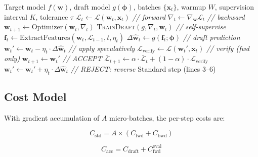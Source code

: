 \documentclass[conference]{IEEEtran}
\begin{document}
\begin{algorithm}[t]
\caption{LST Training Loop}
\label{alg:lst}
\begin{algorithmic}[1]
\REQUIRE Target model $f(\mathbf{w})$, draft model $g(\boldsymbol{\phi})$, batches $\{\mathbf{x}_t\}$, warmup $W$, supervision interval $K$, tolerance $\tau$
        \STATE $\mathcal{L}_t \gets \mathcal{L}(\mathbf{w}_t, \mathbf{x}_t)$ \hfill \textit{// forward}
        \STATE $\nabla_t \gets \nabla_{\mathbf{w}} \mathcal{L}_t$ \hfill \textit{// backward}
        \STATE $\mathbf{w}_{t+1} \gets \mathrm{Optimizer}(\mathbf{w}_t, \nabla_t)$
        \STATE \textsc{TrainDraft}$(g, \nabla_t, \mathbf{w}_t)$ \hfill \textit{// self-supervise}
    \ELSE
        \STATE $\mathbf{f}_t \gets \mathrm{ExtractFeatures}(\mathbf{w}_t, \mathcal{L}_{t-1}, t, \eta_t)$
        \STATE $\Delta\hat{\mathbf{w}}_t \gets g(\mathbf{f}_t; \boldsymbol{\phi})$ \hfill \textit{// draft prediction}
        \STATE $\mathbf{w}_t' \gets \mathbf{w}_t - \eta_t \cdot \Delta\hat{\mathbf{w}}_t$ \hfill \textit{// apply speculatively}
        \STATE $\mathcal{L}_{\mathrm{verify}} \gets \mathcal{L}(\mathbf{w}_t', \mathbf{x}_t)$ \hfill \textit{// verify (fwd only)}
            \STATE $\mathbf{w}_{t+1} \gets \mathbf{w}_t'$ \hfill \textit{// ACCEPT}
            \STATE $\bar{\mathcal{L}}_{t+1} \gets \alpha \cdot \bar{\mathcal{L}}_t + (1 - \alpha) \cdot \mathcal{L}_{\mathrm{verify}}$
        \ELSE
            \STATE $\mathbf{w}_t' \gets \mathbf{w}_t' + \eta_t \cdot \Delta\hat{\mathbf{w}}_t$ \hfill \textit{// REJECT: reverse}
            \STATE Standard step (lines 3--6)
        \ENDIF
    \ENDIF
\ENDFOR
\end{algorithmic}
\end{algorithm}

\subsection{Cost Model}

With gradient accumulation of $A$ micro-batches, the per-step costs are:

\begin{equation}
C_{\mathrm{std}} = A \times (C_{\mathrm{fwd}} + C_{\mathrm{bwd}})
\label{eq:cost_std}
\end{equation}

\begin{equation}
C_{\mathrm{acc}} = C_{\mathrm{draft}} + C_{\mathrm{fwd}}^{\mathrm{eval}}
\label{eq:cost_acc}
\end{equation}
\end{document}

